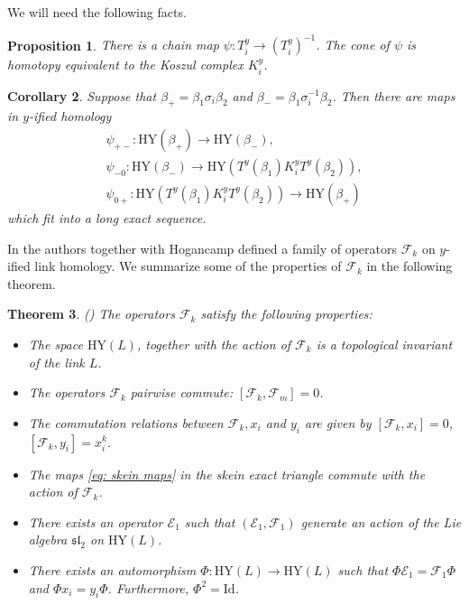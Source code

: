\documentclass{amsart}
\newcommand{\HY}{\mathrm{HY}}
\newcommand{\CE}{\mathcal{E}}
\newcommand{\CF}{\mathcal{F}}
\numberwithin{equation}{section}
\newtheorem{theorem}{Theorem}[section]
\newtheorem{proposition}[theorem]{Proposition}
\newtheorem{corollary}[theorem]{Corollary}
\theoremstyle{definition}
\begin{document}
We will need the following facts.

\begin{proposition}
\label{prop: skein}
There is a chain map $\psi:T_i^y\to (T_i^y)^{-1}$. The cone of $\psi$ is homotopy equivalent to the Koszul complex $K_i^y$.
\end{proposition}

\begin{corollary}
Suppose that $\beta_+=\beta_1\sigma_i\beta_2$ and $\beta_-=\beta_1\sigma_i^{-1}\beta_2$.  Then there are maps in $y$-ified homology
\begin{multline}
\label{eq: skein maps}
\psi_{+-}: \HY(\beta_+)\to \HY(\beta_-),\\ \psi_{-0}:\HY(\beta_-)\to \HY(T^y(\beta_1)K_i^yT^y(\beta_2)),\\  \psi_{0+}:\HY(T^y(\beta_1)K_i^yT^y(\beta_2))\to \HY(\beta_+) 
\end{multline}
which fit into a long exact sequence. 
\end{corollary}

In \cite{GHM} the authors together with Hogancamp defined a family of operators $\CF_k$ on $y$-ified link homology. We summarize some of the properties of $\CF_k$ in the following theorem.

\begin{theorem}(\cite{GHM})
\label{thm: Fk summary}
The operators $\CF_k$ satisfy the following properties:
\begin{itemize}
\item[(a)] The space $\HY(L)$, together with the action of $\CF_k$  is a topological invariant of the link $L$.
\item[(b)] The operators $\CF_k$ pairwise commute: $[\CF_k,\CF_m]=0$.
\item[(c)] The commutation relations between $\CF_k,x_i$ and $y_i$ are given by $[\CF_k,x_i]=0$, $[\CF_k,y_i]=x_i^k$.
\item[(d)] The maps \eqref{eq: skein maps} in the skein exact triangle commute with the action of $\CF_k$.
\item[(e)] There exists an operator $\CE_1$ such that $(\CE_1,\CF_1)$ generate an action of the Lie algebra $\mathfrak{sl}_2$ on $\HY(L)$.  
\item[(f)] There exists an automorphism $\Phi:\HY(L)\to \HY(L)$ such that $\Phi \CE_1=\CF_1\Phi$ and $\Phi x_i=y_i\Phi$. Furthermore, $\Phi^2=\mathrm{Id}$. 
\end{itemize}
\end{theorem}
\end{document}
